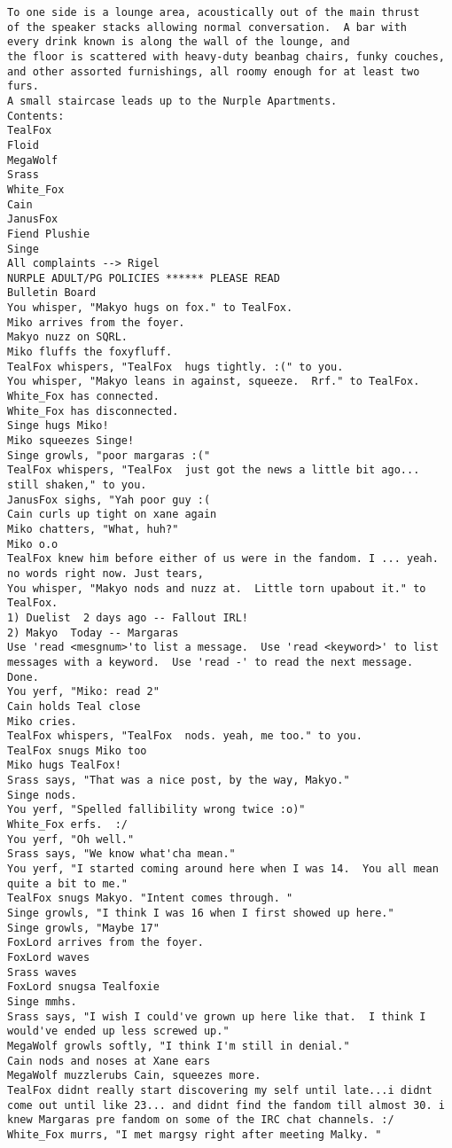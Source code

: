 \begin{verbatim}
To one side is a lounge area, acoustically out of the main thrust
of the speaker stacks allowing normal conversation.  A bar with
every drink known is along the wall of the lounge, and
the floor is scattered with heavy-duty beanbag chairs, funky couches,
and other assorted furnishings, all roomy enough for at least two furs.
A small staircase leads up to the Nurple Apartments.
Contents:
TealFox
Floid
MegaWolf
Srass
White_Fox
Cain
JanusFox
Fiend Plushie
Singe
All complaints --> Rigel
NURPLE ADULT/PG POLICIES ****** PLEASE READ
Bulletin Board
You whisper, "Makyo hugs on fox." to TealFox.
Miko arrives from the foyer.
Makyo nuzz on SQRL.
Miko fluffs the foxyfluff.
TealFox whispers, "TealFox  hugs tightly. :(" to you.
You whisper, "Makyo leans in against, squeeze.  Rrf." to TealFox.
White_Fox has connected.
White_Fox has disconnected.
Singe hugs Miko!
Miko squeezes Singe!
Singe growls, "poor margaras :("
TealFox whispers, "TealFox  just got the news a little bit ago... still shaken," to you.
JanusFox sighs, "Yah poor guy :(
Cain curls up tight on xane again
Miko chatters, "What, huh?"
Miko o.o
TealFox knew him before either of us were in the fandom. I ... yeah. no words right now. Just tears,
You whisper, "Makyo nods and nuzz at.  Little torn upabout it." to TealFox.
1) Duelist  2 days ago -- Fallout IRL!
2) Makyo  Today -- Margaras
Use 'read <mesgnum>'to list a message.  Use 'read <keyword>' to list
messages with a keyword.  Use 'read -' to read the next message.
Done.
You yerf, "Miko: read 2"
Cain holds Teal close
Miko cries.
TealFox whispers, "TealFox  nods. yeah, me too." to you.
TealFox snugs Miko too
Miko hugs TealFox!
Srass says, "That was a nice post, by the way, Makyo."
Singe nods.
You yerf, "Spelled fallibility wrong twice :o)"
White_Fox erfs.  :/
You yerf, "Oh well."
Srass says, "We know what'cha mean."
You yerf, "I started coming around here when I was 14.  You all mean quite a bit to me."
TealFox snugs Makyo. "Intent comes through. "
Singe growls, "I think I was 16 when I first showed up here."
Singe growls, "Maybe 17"
FoxLord arrives from the foyer.
FoxLord waves
Srass waves
FoxLord snugsa Tealfoxie
Singe mmhs.
Srass says, "I wish I could've grown up here like that.  I think I would've ended up less screwed up."
MegaWolf growls softly, "I think I'm still in denial."
Cain nods and noses at Xane ears
MegaWolf muzzlerubs Cain, squeezes more.
TealFox didnt really start discovering my self until late...i didnt come out until like 23... and didnt find the fandom till almost 30. i knew Margaras pre fandom on some of the IRC chat channels. :/
White_Fox murrs, "I met margsy right after meeting Malky. "

\end{verbatim}
